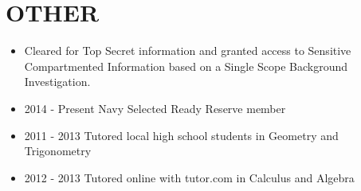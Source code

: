 \documentclass[10pt]{article}
\def\tightlist{}
\begin{document}
\section{OTHER}\label{other}

\begin{itemize}
\tightlist
\item
  Cleared for Top Secret information and granted access to Sensitive
  Compartmented Information based on a Single Scope Background
  Investigation.
\item
  2014 - Present Navy Selected Ready Reserve member
\item
  2011 - 2013 Tutored local high school students in Geometry and
  Trigonometry
\item
  2012 - 2013 Tutored online with tutor.com in Calculus and Algebra
\end{itemize}

\end{document}
